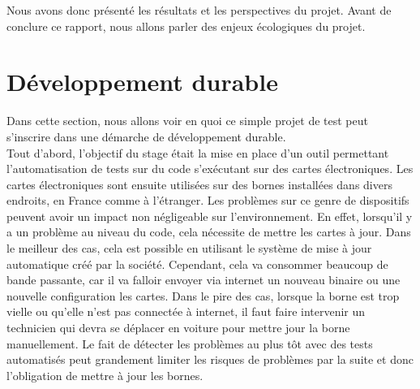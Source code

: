 \documentclass[a4paper]{article}
\begin{document}
Nous avons donc présenté les résultats et les perspectives du projet. Avant de
conclure ce rapport, nous allons parler des enjeux écologiques du projet.

\clearpage
\section{Développement durable}%

Dans cette section, nous allons voir en quoi ce simple projet de test peut
s'inscrire dans une démarche de développement durable.\\

Tout d'abord, l'objectif du stage était la mise en place d'un outil permettant
l'automatisation de tests sur du code s'exécutant sur des cartes électroniques.
Les cartes électroniques sont ensuite utilisées sur des bornes installées dans
divers endroits, en France comme à l'étranger. Les problèmes sur ce genre de
dispositifs peuvent avoir un impact non négligeable sur l'environnement. En
effet, lorsqu'il y a un problème au niveau du code, cela nécessite de mettre
les cartes à jour. Dans le meilleur des cas, cela est possible en utilisant le
système de mise à jour automatique créé par la société. Cependant, cela va
consommer beaucoup de bande passante, car il va falloir envoyer via internet un
nouveau binaire ou une nouvelle configuration les cartes. Dans le pire des cas,
lorsque la borne est trop vielle ou qu'elle n'est pas connectée à internet, il
faut faire intervenir un technicien qui devra se déplacer en voiture pour mettre
jour la borne manuellement. Le fait de détecter les problèmes au plus tôt avec
des tests automatisés peut grandement limiter les risques de problèmes par la
suite et donc l'obligation de mettre à jour les bornes.
\end{document}
